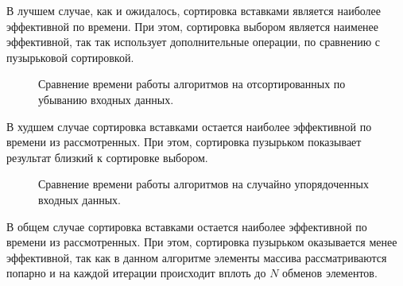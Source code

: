 В лучшем случае, как и ожидалось, сортировка вставками является наиболее эффективной по времени. При этом, сортировка выбором является наименее эффективной, так так использует дополнительные операции, по сравнению с пузырьковой сортировкой.

\begin{figure}[ht]
	\centering
	\captionsetup{justification=centering}
	\caption{Сравнение времени работы алгоритмов на отсортированных по убыванию входных данных.}
	\label{plt:time_reversed_cmp}
\end{figure}

В худшем случае сортировка вставками остается наиболее эффективной по времени из рассмотренных. При этом, сортировка пузырьком показывает результат близкий к сортировке выбором.

\begin{figure}[ht]
	\centering
	\captionsetup{justification=centering}
	\caption{Сравнение времени работы алгоритмов на случайно упорядоченных входных данных.}
	\label{plt:time_random_cmp}
\end{figure}

В общем случае сортировка вставками остается наиболее эффективной по времени из рассмотренных. При этом, сортировка пузырьком оказывается менее эффективной, так как в данном алгоритме элементы массива рассматриваются попарно и на каждой итерации происходит вплоть до $N$ обменов элементов.

